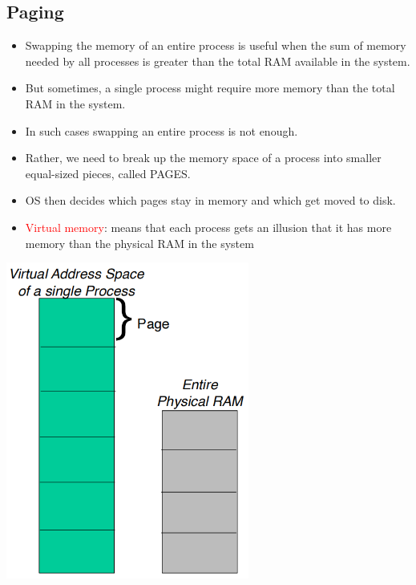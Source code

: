 \documentclass[12pt]{article}
\begin{document}
\subsection{Paging}
\begin{itemize}
    \item Swapping the memory of an entire process is useful when the sum of memory needed by all processes is greater than the total RAM available in the system. 
    \item But sometimes, a single process might require more memory than the total RAM in the system. 
    \item In such cases swapping an entire process is not enough. 
    \item Rather, we need to break up the memory space of a process into smaller equal-sized pieces, called PAGES. 
    \item OS then decides which pages stay in memory and which get moved to disk.
    \item \textcolor{red}{Virtual memory}: means that each process gets an illusion that it has more memory than the physical RAM in the system
\end{itemize}
\includegraphics[width=0.6\textwidth]{Paging.png}
\end{document}
